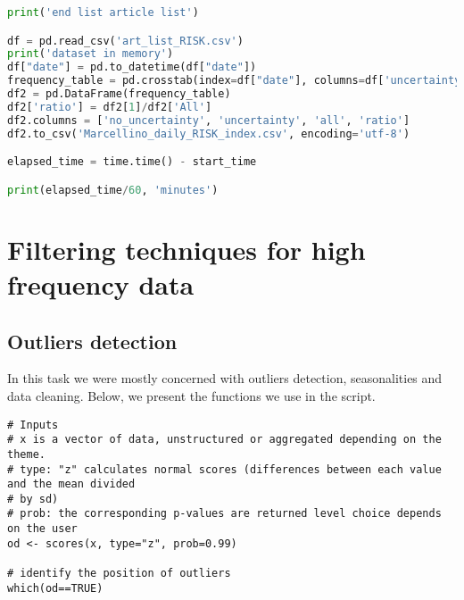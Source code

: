 \documentclass[12pt]{article}
\begin{document}
\begin{lstlisting}[language=Python,title=\textbf{Index construction.}]
print('end list article list')

df = pd.read_csv('art_list_RISK.csv')
print('dataset in memory')
df["date"] = pd.to_datetime(df["date"])
frequency_table = pd.crosstab(index=df["date"], columns=df['uncertainty'], margins=True)
df2 = pd.DataFrame(frequency_table)
df2['ratio'] = df2[1]/df2['All']
df2.columns = ['no_uncertainty', 'uncertainty', 'all', 'ratio']
df2.to_csv('Marcellino_daily_RISK_index.csv', encoding='utf-8')

elapsed_time = time.time() - start_time

print(elapsed_time/60, 'minutes')
\end{lstlisting}

\section{Filtering techniques for high frequency data}

\subsection{Outliers detection \textendash{} {\href{https://github.com/eurostat/econowcast/blob/master/filter/Outliers.R}{}}}

In this task we were mostly concerned with outliers detection, seasonalities
and data cleaning. Below, we present the functions we use in the  script.

\begin{lstlisting}[title=\textbf{Using \sf{scores} from the {\sf{outliers}} package.}]
# Inputs
# x is a vector of data, unstructured or aggregated depending on the theme.
# type: "z" calculates normal scores (differences between each value and the mean divided 
# by sd)
# prob: the corresponding p-values are returned level choice depends on the user
od <- scores(x, type="z", prob=0.99)

# identify the position of outliers
which(od==TRUE)
\end{lstlisting}
\end{document}

